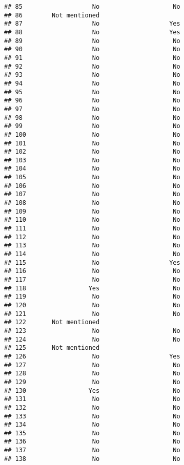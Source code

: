\documentclass[
]{article}
\begin{document}
\begin{verbatim}
## 85                   No                    No
## 86        Not mentioned                      
## 87                   No                   Yes
## 88                   No                   Yes
## 89                   No                    No
## 90                   No                    No
## 91                   No                    No
## 92                   No                    No
## 93                   No                    No
## 94                   No                    No
## 95                   No                    No
## 96                   No                    No
## 97                   No                    No
## 98                   No                    No
## 99                   No                    No
## 100                  No                    No
## 101                  No                    No
## 102                  No                    No
## 103                  No                    No
## 104                  No                    No
## 105                  No                    No
## 106                  No                    No
## 107                  No                    No
## 108                  No                    No
## 109                  No                    No
## 110                  No                    No
## 111                  No                    No
## 112                  No                    No
## 113                  No                    No
## 114                  No                    No
## 115                  No                   Yes
## 116                  No                    No
## 117                  No                    No
## 118                 Yes                    No
## 119                  No                    No
## 120                  No                    No
## 121                  No                    No
## 122       Not mentioned                      
## 123                  No                    No
## 124                  No                    No
## 125       Not mentioned                      
## 126                  No                   Yes
## 127                  No                    No
## 128                  No                    No
## 129                  No                    No
## 130                 Yes                    No
## 131                  No                    No
## 132                  No                    No
## 133                  No                    No
## 134                  No                    No
## 135                  No                    No
## 136                  No                    No
## 137                  No                    No
## 138                  No                    No

\end{verbatim}
\end{document}
